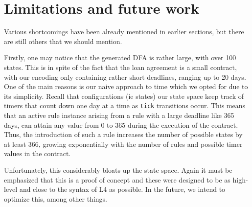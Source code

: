 \documentclass{article}
\begin{document}


\section{Limitations and future work}

Various shortcomings have been already mentioned in earlier sections, but
there are still others that we should mention.

Firstly, one may notice that the generated DFA is rather large, with over 100
states.
This is in spite of the fact that the loan agreement is a small contract,
with our encoding only containing rather short deadlines, ranging
up to 20 days.
One of the main reasons is our naive approach to time which we opted for due to
its simplicity.
Recall that configurations (ie states) our state space keep track of timers
that count down one day at a time as \texttt{tick} transitions occur.
This means that an active rule instance arising from a rule with a large deadline
like 365 days, can attain any value from 0 to 365 during the execution of the
contract.
Thus, the introduction of such a rule increases the number of possible states
by at least 366, growing exponentially with the number of rules and possible
timer values in the contract.

Unfortunately, this considerably bloats up the state space.
Again it must be emphasized that this is a proof of concept and these were
designed to be as high-level and close to the syntax of L4 as possible.
In the future, we intend to optimize this, among other things.


\end{document}

